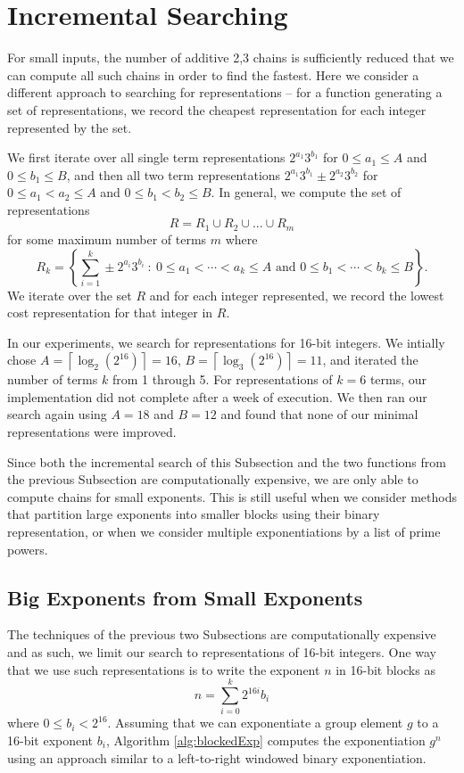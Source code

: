 \documentclass{ucalgthes1}
\theoremstyle{definition}
\newcommand{\ceil}[1]{\left\lceil #1 \right\rceil}
\begin{document}
\section{Incremental Searching}

For small inputs, the number of additive 2,3 chains is sufficiently reduced that we can compute all such chains in order to find the fastest.  Here we consider a different approach to searching for representations -- for a function generating a set of representations, we record the cheapest representation for each integer represented by the set.

We first iterate over all single term representations $2^{a_1}3^{b_1}$ for $0 \le a_1 \le A$ and $0 \le b_1 \le B$, and then all two term representations $2^{a_1}3^{b_1} \pm 2^{a_2}3^{b_2}$ for $0 \le a_1 < a_2 \le A$ and $0 \le b_1 < b_2 \le B$.  In general, we compute the set of representations
\[
R = R_1 \cup R_2 \cup ... \cup R_m
\]
for some maximum number of terms $m$ where
\[
R_k = \left\{\sum_{i=1}^k\pm 2^{a_i}3^{b_i} ~:~ 0 \le a_1 < \cdots < a_k \le A \textrm{ and } 0 \le b_1 < \cdots < b_k \le B \right\}.
\]
We iterate over the set $R$ and for each integer represented, we record the lowest cost representation for that integer in $R$.

In our experiments, we search for representations for 16-bit integers. We intially chose $A = \ceil{\log_2\left(2^{16}\right)} = 16$, $B = \ceil{\log_3 \left(2^{16}\right)} = 11$, and iterated the number of terms $k$ from 1 through 5. For representations of $k = 6$ terms, our implementation did not complete after a week of execution.  We then ran our search again using $A=18$ and $B=12$ and found that none of our minimal representations were improved.

Since both the incremental search of this Subsection and the two functions from the previous Subsection are computationally expensive, we are only able to compute chains for small exponents.  This is still useful when we consider methods that partition large exponents into smaller blocks using their binary representation, or when we consider multiple exponentiations by a list of prime powers.


\subsection{Big Exponents from Small Exponents}

The techniques of the previous two Subsections are computationally expensive and as such, we limit our search to representations of 16-bit integers.  One way that we use such representations is to write the exponent $n$ in 16-bit blocks as
\[
	n = \sum_{i=0}^k 2^{16i} b_i
\]
where $0 \le b_i < 2^{16}$.  Assuming that we can exponentiate a group element $g$ to a 16-bit exponent $b_i$, Algorithm \ref{alg:blockedExp} computes the exponentiation $g^n$ using an approach similar to a left-to-right windowed binary exponentiation.
\end{document}
